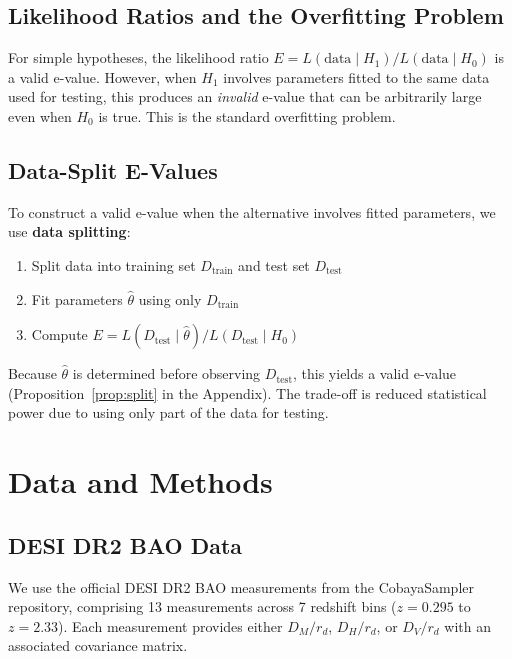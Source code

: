 \documentclass[11pt,a4paper]{article}
\begin{document}
\subsection{Likelihood Ratios and the Overfitting Problem}

For simple hypotheses, the likelihood ratio $E = L(\text{data} \mid H_1) / L(\text{data} \mid H_0)$ is a valid e-value. However, when $H_1$ involves parameters fitted to the same data used for testing, this produces an \textit{invalid} e-value that can be arbitrarily large even when $H_0$ is true. This is the standard overfitting problem.

\subsection{Data-Split E-Values}

To construct a valid e-value when the alternative involves fitted parameters, we use \textbf{data splitting}:
\begin{enumerate}
    \item Split data into training set $D_{\text{train}}$ and test set $D_{\text{test}}$
    \item Fit parameters $\hat{\theta}$ using only $D_{\text{train}}$
    \item Compute $E = L(D_{\text{test}} \mid \hat{\theta}) / L(D_{\text{test}} \mid H_0)$
\end{enumerate}

Because $\hat{\theta}$ is determined before observing $D_{\text{test}}$, this yields a valid e-value (Proposition~\ref{prop:split} in the Appendix). The trade-off is reduced statistical power due to using only part of the data for testing.

\section{Data and Methods}
\label{sec:methods}

\subsection{DESI DR2 BAO Data}

We use the official DESI DR2 BAO measurements from the CobayaSampler repository, comprising 13 measurements across 7 redshift bins ($z = 0.295$ to $z = 2.33$). Each measurement provides either $D_M/r_d$, $D_H/r_d$, or $D_V/r_d$ with an associated covariance matrix.
\end{document}
